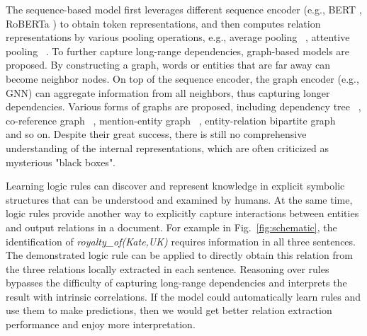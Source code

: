 \documentclass[11pt]{article}
\begin{document}
The sequence-based model first leverages different sequence encoder (e.g., BERT \cite{devlin-etal-2019-bert}, RoBERTa \cite{liu2019roberta}) to obtain token representations, 
and then computes relation representations by various pooling operations,
e.g., average pooling ~\cite{yao-etal-2019-docred, xu2021entity}, attentive pooling ~\cite{zhou2021atlop}.
To further capture long-range dependencies, graph-based models are proposed.
By constructing a graph, words or entities that are far away can become neighbor nodes.
On top of the sequence encoder, the graph encoder (e.g., GNN) can aggregate information from all neighbors, thus capturing longer dependencies.
Various forms of graphs are proposed, including
dependency tree ~\cite{peng-etal-2017-cross, zhang-etal-2018-graph},
co-reference graph ~\cite{sahu-etal-2019-inter},
mention-entity graph ~\cite{christopoulou-etal-2019-connecting, zeng-etal-2020-double},
entity-relation bipartite graph ~\cite{sun2019joint} and so on.
Despite their great success, there is still no comprehensive understanding of the internal representations, which are often criticized as mysterious "black boxes".

Learning logic rules can discover and represent knowledge in explicit symbolic structures that can be understood and examined by humans.
At the same time, logic rules provide another way to explicitly capture interactions between entities and output relations in a document.
For example in Fig.~\ref{fig:schematic}, the identification of \textit{royalty\_of(Kate,UK)} requires information in all three sentences. The demonstrated logic rule can be applied to directly obtain this relation from the three relations locally extracted in each sentence. Reasoning over rules bypasses the difficulty of capturing long-range dependencies and interprets the result with intrinsic correlations.
If the model could automatically learn rules and use them to make predictions, then we would get better relation extraction performance and enjoy more interpretation.
\end{document}
